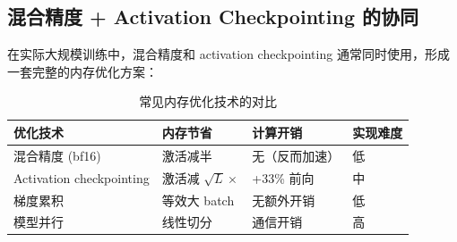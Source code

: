 \subsection{混合精度 + Activation Checkpointing 的协同}

在实际大规模训练中，混合精度和 activation checkpointing 通常同时使用，形成一套完整的内存优化方案：

\begin{table}[H]
\centering
\begin{tabular}{p{}p{}p{}p{}}
\toprule
\textbf{优化技术} & \textbf{内存节省} & \textbf{计算开销} & \textbf{实现难度} \\
\midrule
混合精度 (bf16) & 激活减半 & 无（反而加速） & 低 \\
Activation checkpointing & 激活减 $\sqrt{L}\times$ & +33\% 前向 & 中 \\
梯度累积 & 等效大 batch & 无额外开销 & 低 \\
模型并行 & 线性切分 & 通信开销 & 高 \\
\bottomrule
\end{tabular}
\caption{常见内存优化技术的对比}
\end{table}

